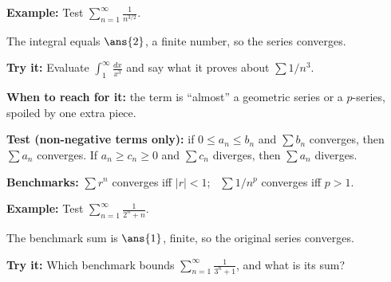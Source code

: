 \documentclass[12pt]{article}
\begin{document}
\begin{examplebox}
\textbf{Example:} \quad Test $\displaystyle\sum_{n=1}^{\infty}\frac{1}{n^{3/2}}$.
\step{$f$ is positive, continuous, decreasing on $[1,\infty)$, and $\int_{1}^{\infty}x^{-3/2}dx=\lim\limits_{b\to\infty}\left[-2x^{-1/2}\right]_{1}^{b}$.}

The integral equals $\ans{2}$, a finite number, so the series converges.
\end{examplebox}

\begin{tryitbox}
\textbf{Try it:} \quad Evaluate $\displaystyle\int_{1}^{\infty}\frac{dx}{x^{3}}$ and say what it proves about $\sum 1/n^{3}$.\\[2pt]
\end{tryitbox}


\begin{formulabox}
\textbf{When to reach for it:} the term is ``almost'' a geometric series or a $p$-series, spoiled by one extra piece.\par
\textbf{Test (non-negative terms only):} if $0\le a_{n}\le b_{n}$ and $\sum b_{n}$ converges, then $\sum a_{n}$ converges. If $a_{n}\ge c_{n}\ge 0$ and $\sum c_{n}$ diverges, then $\sum a_{n}$ diverges.\par
\textbf{Benchmarks:} $\sum r^{n}$ converges iff $|r|<1$; \ $\sum 1/n^{p}$ converges iff $p>1$.
\end{formulabox}

\begin{examplebox}
\textbf{Example:} \quad Test $\displaystyle\sum_{n=1}^{\infty}\frac{1}{2^{n}+n}$.

The benchmark sum is $\ans{1}$, finite, so the original series converges.
\end{examplebox}

\begin{tryitbox}
\textbf{Try it:} \quad Which benchmark bounds $\displaystyle\sum_{n=1}^{\infty}\frac{1}{3^{n}+1}$, and what is its sum?\\[2pt]
\end{tryitbox}
\end{document}
